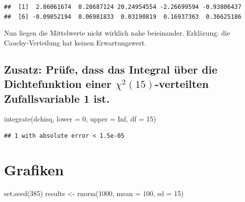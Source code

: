 \documentclass[12pt,a4paper]{article}
\newenvironment{Shaded}{\begin{snugshade}}{\end{snugshade}}
\newcommand{\AttributeTok}[1]{\textcolor[rgb]{0.77,0.63,0.00}{#1}}
\newcommand{\ConstantTok}[1]{\textcolor[rgb]{0.00,0.00,0.00}{#1}}
\newcommand{\DecValTok}[1]{\textcolor[rgb]{0.00,0.00,0.81}{#1}}
\newcommand{\FunctionTok}[1]{\textcolor[rgb]{0.00,0.00,0.00}{#1}}
\newcommand{\NormalTok}[1]{#1}
\newcommand{\OtherTok}[1]{\textcolor[rgb]{0.56,0.35,0.01}{#1}}
\begin{document}
\begin{verbatim}
##  [1]  2.86061674  0.28687124 20.24954554 -2.26699594 -0.93806437
##  [6] -0.09852194  0.06981833  0.03190819  0.16937363  0.36625186
\end{verbatim}

Nun liegen die Mittelwerte nicht wirklich nahe beieinander. Erklärung:
die Cauchy-Verteilung hat keinen Erwartungswert.

\hypertarget{zusatz-pruxfcfe-dass-das-integral-uxfcber-die-dichtefunktion-einer-chi215-verteilten-zufallsvariable-1-ist.}{%
\subsection{\texorpdfstring{Zusatz: Prüfe, dass das Integral über die
Dichtefunktion einer \(\chi^2(15)\)-verteilten Zufallsvariable 1
ist.}{Zusatz: Prüfe, dass das Integral über die Dichtefunktion einer \textbackslash chi\^{}2(15)-verteilten Zufallsvariable 1 ist.}}\label{zusatz-pruxfcfe-dass-das-integral-uxfcber-die-dichtefunktion-einer-chi215-verteilten-zufallsvariable-1-ist.}}

\begin{Shaded}
\begin{Highlighting}[]
    \FunctionTok{integrate}\NormalTok{(dchisq, }\AttributeTok{lower =} \DecValTok{0}\NormalTok{, }\AttributeTok{upper =} \ConstantTok{Inf}\NormalTok{, }\AttributeTok{df =} \DecValTok{15}\NormalTok{)}
\end{Highlighting}
\end{Shaded}

\begin{verbatim}
## 1 with absolute error < 1.5e-05
\end{verbatim}

\newpage

\hypertarget{grafiken}{%
\section{Grafiken}\label{grafiken}}

\begin{Shaded}
\begin{Highlighting}[]
\FunctionTok{set.seed}\NormalTok{(}\DecValTok{385}\NormalTok{)}
\NormalTok{results }\OtherTok{\textless{}{-}} \FunctionTok{rnorm}\NormalTok{(}\DecValTok{1000}\NormalTok{, }\AttributeTok{mean =} \DecValTok{100}\NormalTok{, }\AttributeTok{sd =} \DecValTok{15}\NormalTok{)}
\end{Highlighting}
\end{Shaded}
\end{document}
